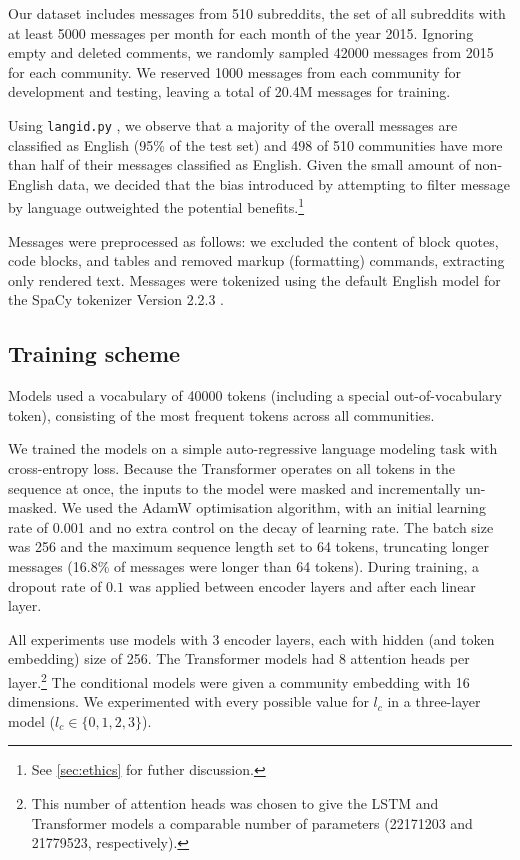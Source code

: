 \documentclass[11pt]{article}
\begin{document}
Our dataset includes messages from \num{510} subreddits, 
the set of all subreddits 
with at least \num{5000} messages per month for each month
of the year 2015.
Ignoring empty and deleted comments, we randomly sampled
\num{42000} messages from 2015 for each community.
We reserved \num{1000} messages from each community for development and testing,
leaving a total of \num{20.4}M messages for training.

Using \texttt{langid.py} \citep{Lui2012}, we observe that a majority of the overall
messages are classified as English (95\% of the test set) and 498 of \num{510} communities %
have more than half of their messages classified as English.
Given the small amount of non-English data, 
we decided that the bias introduced by attempting to filter message
by language outweighted the potential benefits.\footnote{
  See \cref{sec:ethics} for futher discussion.}

Messages were preprocessed as follows:
we excluded the content of block quotes, code blocks, and tables and
removed markup (formatting) commands, 
extracting only rendered text.
Messages were tokenized using the default English model for the SpaCy tokenizer 
Version 2.2.3 \citep{Honnibal2017}.


\subsection{Training scheme}

Models used a vocabulary of \num{40000} tokens (including a special
out-of-vocabulary token), consisting of the most frequent tokens
across all communities.

We trained the models on a simple 
auto-regressive language modeling task with cross-entropy loss.  Because
the Transformer operates on all tokens in the sequence at once, the
inputs to the model were masked and incrementally un-masked.
We used the AdamW
\citep{Loshchilov2019} optimisation algorithm, with an initial
learning rate of \num{0.001} and no extra control on the decay
of learning rate.
%
The batch size was \num{256} and the maximum sequence length set to
\num{64} tokens, truncating longer messages (16.8\% of messages were
longer than \num{64} tokens).  During training, a dropout rate of
$0.1$ was applied between encoder layers and after each linear layer.

All experiments use models with \num{3} encoder layers,
each with hidden (and token embedding) size of \num{256}. 
The Transformer models had \num{8} attention heads per layer.\footnote{
  This number of attention heads was chosen to give the LSTM and Transformer
  models a comparable number of parameters 
  (\num{22171203} and \num{21779523}, respectively).}
The conditional models were given a community embedding with \num{16} dimensions. 
We experimented with every possible value for $l_c$ in a three-layer model ($l_c\in\{0,1,2,3\}$).
\end{document}
